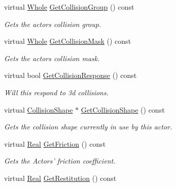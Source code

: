 \begin{DoxyCompactItemize}
virtual \hyperlink{namespacephys_a460f6bc24c8dd347b05e0366ae34f34a}{Whole} \hyperlink{classphys_1_1ActorBasePhysicsSettings_a6090c93f35beea7c82550076a17aef24}{GetCollisionGroup} () const 
\begin{DoxyCompactList}\small\item\em Gets the actors collision group. \item\end{DoxyCompactList}\item 
virtual \hyperlink{namespacephys_a460f6bc24c8dd347b05e0366ae34f34a}{Whole} \hyperlink{classphys_1_1ActorBasePhysicsSettings_a8a3a7ca225dd9697495bcc7d51b0942a}{GetCollisionMask} () const 
\begin{DoxyCompactList}\small\item\em Gets the actors collision mask. \item\end{DoxyCompactList}\item 
virtual bool \hyperlink{classphys_1_1ActorBasePhysicsSettings_aa131aa28b9e5c7a53c65c4e229f13ed1}{GetCollisionResponse} () const 
\begin{DoxyCompactList}\small\item\em Will this respond to 3d collisions. \item\end{DoxyCompactList}\item 
virtual \hyperlink{classphys_1_1CollisionShape}{CollisionShape} $\ast$ \hyperlink{classphys_1_1ActorBasePhysicsSettings_ae436b1edd205b48225590dab21eb3551}{GetCollisionShape} () const 
\begin{DoxyCompactList}\small\item\em Gets the collision shape currently in use by this actor. \item\end{DoxyCompactList}\item 
virtual \hyperlink{namespacephys_af7eb897198d265b8e868f45240230d5f}{Real} \hyperlink{classphys_1_1ActorBasePhysicsSettings_ad38f4ccdbc0ecf997bb9745c23961f6d}{GetFriction} () const 
\begin{DoxyCompactList}\small\item\em Gets the Actors' friction coefficient. \item\end{DoxyCompactList}\item 
virtual \hyperlink{namespacephys_af7eb897198d265b8e868f45240230d5f}{Real} \hyperlink{classphys_1_1ActorBasePhysicsSettings_a937e66bb0293c4162fae48d9e37196f4}{GetRestitution} () const 

\end{DoxyCompactItemize}
